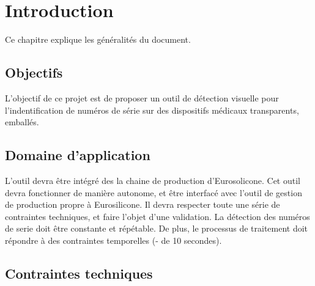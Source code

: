 \chapter{Introduction}

Ce chapitre explique les généralités du document.

\section{Objectifs}

L’objectif de ce projet est de proposer un outil de détection visuelle pour l’indentification de numéros de série sur des dispositifs médicaux transparents, emballés.

\section{Domaine d’application}

L’outil devra être intégré des la chaine de production d’Eurosolicone.
Cet outil devra fonctionner de manière autonome, et être interfacé avec l’outil de gestion de production propre à Eurosilicone. Il devra respecter toute une série de contraintes techniques, et faire l’objet d’une validation.
La détection des numéros de serie doit être constante et répétable. De plus, le processus de traitement doit répondre à des contraintes temporelles (- de 10 secondes).

\section{Contraintes techniques}
